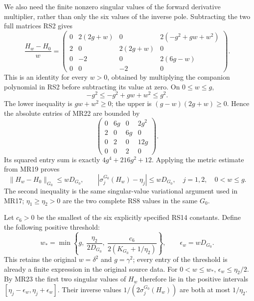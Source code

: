 \documentclass[11pt]{article}
\begin{document}
We also need the finite nonzero singular values of the
forward derivative multiplier, rather than only the six
values of the inverse pole. Subtracting the two full
matrices RS2 gives
\begin{equation}
 \frac{H_w-H_0}{w}=
 \begin{pmatrix}
 0&2(2g+w)&0&2(-g^2+gw+w^2)\\
 2&0&2(2g+w)&0\\
 0&-2&0&2(6g-w)\\
 0&0&-2&0
 \end{pmatrix}.
 \tag{MR22}
\end{equation}
This is an identity for every $w>0$, obtained by multiplying
the companion polynomial in RS2 before subtracting its value
at zero. On $0\le w\le g$,
\[
 -g^2\le -g^2+gw+w^2\le g^2.
\]
The lower inequality is $gw+w^2\ge0$; the upper is
$(g-w)(2g+w)\ge0$. Hence the absolute entries of MR22 are
bounded by
\[
 \begin{pmatrix}
 0&6g&0&2g^2\\2&0&6g&0\\0&2&0&12g\\0&0&2&0
 \end{pmatrix}.
\]
Its squared entry sum is exactly $4g^4+216g^2+12$.
Applying the metric estimate from MR19 proves
\begin{equation}
 \|H_w-H_0\|_{G_0}\le wD_{G_0},\qquad
 |\sigma_j^{G_0}(H_w)-\eta_j|\le wD_{G_0},
 \quad j=1,2,\quad 0<w\le g.
 \tag{MR23}
\end{equation}
The second inequality is the same singular-value variational
argument used in MR17; $\eta_1\ge\eta_2>0$ are the two
complete RS8 values in the same $G_0$.

Let $c_6>0$ be the smallest of the six explicitly specified
RS14 constants. Define the following positive threshold:
\begin{equation}
 w_*=\min\left\{
 g,\ \frac{\eta_2}{2D_{G_0}},\
 \frac{c_6}{2(K_{G_0}+1/\eta_2)}
 \right\},\qquad \epsilon_w=wD_{G_0}.
 \tag{MR24}
\end{equation}
This retains the original $w=\delta^2$ and $g=\gamma^2$;
every entry of the threshold is already a finite expression
in the original source data. For $0<w\le w_*$,
$\epsilon_w\le\eta_2/2$. By MR23 the first two singular
values of $H_w$ therefore lie in the positive intervals
$[\eta_j-\epsilon_w,\eta_j+\epsilon_w]$.
Their inverse values $1/(2\sigma_j^{G_0}(H_w))$ are both
at most $1/\eta_2$.
\end{document}
